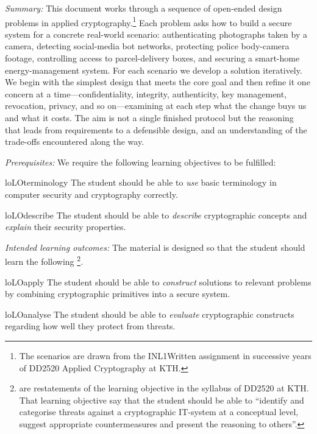 
\emph{Summary:}
This document works through a sequence of open-ended design problems in
applied cryptography.\footnote{%
  The scenarios are drawn from the INL1Written assignment in successive
  years of DD2520 Applied Cryptography at KTH\@.
}
Each problem asks how to build a secure system for a concrete real-world
scenario: authenticating photographs taken by a camera, detecting
social-media bot networks, protecting police body-camera footage,
controlling access to parcel-delivery boxes, and securing a smart-home
energy-management system.
For each scenario we develop a solution iteratively.
We begin with the simplest design that meets the core goal and then refine
it one concern at a time---confidentiality, integrity, authenticity, key
management, revocation, privacy, and so on---examining at each step what the
change buys us and what it costs.
The aim is not a single finished protocol but the reasoning that leads from
requirements to a defensible design, and an understanding of the trade-offs
encountered along the way.

\emph{Prerequisites:}
We require the following learning objectives to be fulfilled:
\begin{restatable}{lo}{LOterminology}\label{LOterminology}
  The student should be able to \emph{use} basic terminology in computer
  security and cryptography correctly.
\end{restatable}
\begin{restatable}{lo}{LOdescribe}\label{LOdescribe}
  The student should be able to \emph{describe} cryptographic concepts and
  \emph{explain} their security properties.
\end{restatable}

\emph{Intended learning outcomes:}
The material is designed so that the student should learn the following%
\footnote{%
   are restatements of the learning objective in the 
  syllabus of DD2520 at KTH.
  That learning objective say that the student should be able to 
  \enquote{identify and categorise threats against a cryptographic IT-system at 
  a conceptual level, suggest appropriate countermeasures and present the 
reasoning to others}.
}.
\begin{restatable}{lo}{LOapply}\label{LOapply}
  The student should be able to \emph{construct} solutions to relevant problems 
  by combining cryptographic primitives into a secure system.
\end{restatable}
\begin{restatable}{lo}{LOanalyse}\label{LOanalyse}
  The student should be able to \emph{evaluate} cryptographic constructs 
  regarding how well they protect from threats.
\end{restatable}

